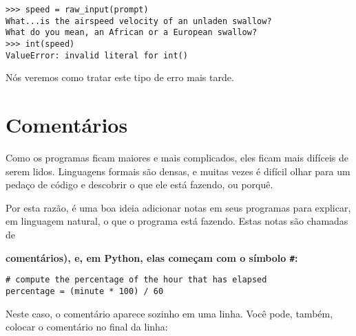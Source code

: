 {{{{{{{{{{{{{{{{\beforeverb
\begin{verbatim}
>>> speed = raw_input(prompt)
What...is the airspeed velocity of an unladen swallow?
What do you mean, an African or a European swallow?
>>> int(speed)
ValueError: invalid literal for int()
\end{verbatim}
\afterverb
%

Nós veremos como tratar este tipo de erro mais tarde.


\section{Comentários}


Como os programas ficam maiores e mais complicados, eles ficam mais difíceis 
de serem lidos. Linguagens formais são densas, e muitas vezes é difícil 
olhar para um pedaço de código e descobrir o que ele está fazendo, ou porquê.

Por esta razão, é uma boa ideia adicionar notas em seus programas para explicar,
em linguagem natural, o que o programa está fazendo. Estas notas são chamadas 
de {\bf comentários), e, em Python, elas começam com o símbolo \verb"#":

\beforeverb
\begin{verbatim}
# compute the percentage of the hour that has elapsed
percentage = (minute * 100) / 60
\end{verbatim}
\afterverb
%

Neste caso, o comentário aparece sozinho em uma linha. Você pode, também, colocar
o comentário no final da linha:

}}}}}}}}}}}}}}}}}
